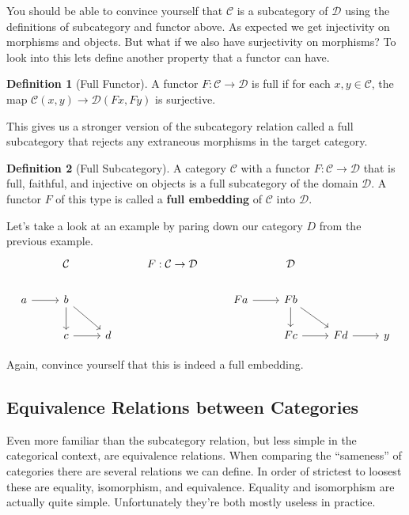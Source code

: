 \documentclass[12pt]{article}
\theoremstyle{definition}
\newtheorem{definition}{Definition}
\begin{document}
You should be able to convince yourself that $\mathcal{C}$ is a subcategory of $\mathcal{D}$ using the definitions of subcategory and functor above.
As expected we get injectivity on morphisms and objects.
But what if we also have surjectivity on morphisms?
To look into this lets define another property that a functor can have.

\begin{definition}[Full Functor]
    A functor $F:\mathcal{C}\rightarrow\mathcal{D}$ is full if for each $x,y\in\mathcal{C}$, the map $\mathcal{C}(x, y)\rightarrow\mathcal{D}(Fx,Fy)$ is surjective.
\end{definition}

This gives us a stronger version of the subcategory relation called a full subcategory that rejects any extraneous morphisms in the target category.

\begin{definition}[Full Subcategory]
    A category $\mathcal{C}$ with a functor $F:\mathcal{C}\rightarrow\mathcal{D}$ that is full, faithful, and injective on objects is a full subcategory of the domain $\mathcal{D}$.
    A functor $F$ of this type is called a \textbf{full embedding} of $\mathcal{C}$ into $\mathcal{D}$.
\end{definition}

Let's take a look at an example by paring down our category $D$ from the previous example.
\[\begin{tikzcd}
        & {\mathcal{C}} && {F:\mathcal{C}\rightarrow\mathcal{D}} && {\mathcal{D}} \\
        a & b &&& Fa & Fb \\
        & c & d &&& Fc & Fd & y
        \arrow[from=2-1, to=2-2]
        \arrow[from=2-2, to=3-2]
        \arrow[from=3-2, to=3-3]
        \arrow[from=2-2, to=3-3]
        \arrow[from=2-5, to=2-6]
        \arrow[from=2-6, to=3-7]
        \arrow[from=3-6, to=3-7]
        \arrow[from=2-6, to=3-6]
        \arrow[from=3-7, to=3-8]
    \end{tikzcd}\]

Again, convince yourself that this is indeed a full embedding.



\subsection*{Equivalence Relations between Categories}
Even more familiar than the subcategory relation, but less simple in the categorical context, are equivalence relations.
When comparing the ``sameness'' of categories there are several relations we can define.
In order of strictest to loosest these are equality, isomorphism, and equivalence.
Equality and isomorphism are actually quite simple.
Unfortunately they're both mostly useless in practice.
\end{document}
